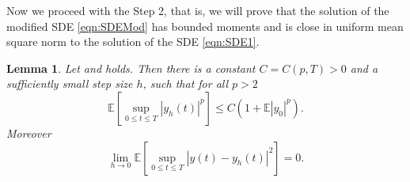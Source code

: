 \documentclass[3p]{elsarticle}
\theoremstyle{definition}
\theoremstyle{plain}%
\newtheorem{lem}{Lemma}[section]
\theoremstyle{remark}
\newcommand{\m}[1]{\mathbb{E}#1}
\begin{document}
	Now we proceed with the Step 2, that is,  we will prove that the solution  of the modified
SDE \eqref{eqn:SDEMod} has bounded moments and is close in uniform mean square norm to the solution of the SDE 
\eqref{eqn:SDE1}.
\begin{lem}\label{lem:BoundAndConvergenceOfyh}
	Let  and  holds. Then there is a constant $C=C(p,T)>0$ and a sufficiently small
	step size $h$, such that for all $p>2$
	\begin{equation}\label{eqn:yh-MomentBounds}
		\m\left[
			\sup_{0\leq t \leq T}
				|y_h(t)|^p
		\right]
		\leq
			C
		\left( 
			1+\m |y_0|^p
		\right).
	\end{equation}
	Moreover
	\begin{equation}\label{eqn:yh-convergence}
	\lim_{h \to 0}
	\m\left[
	\sup_{0\leq t \leq T}
	|y(t)-y_h(t)|^2
	\right]=0.
	\end{equation}
\end{lem}
\end{document}
